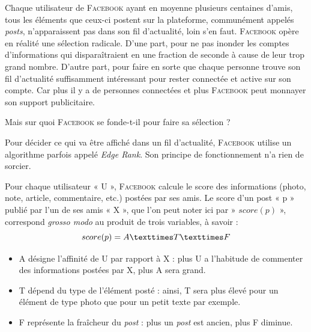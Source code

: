 Chaque utilisateur de \textsc{Facebook} ayant en moyenne plusieurs centaines d'amis, tous les éléments que ceux-ci postent sur la plateforme, communément appelés \textit{posts}, n'apparaissent pas dans son fil d'actualité, loin s'en faut. \textsc{Facebook} opère en réalité une sélection radicale. D'une part, pour ne pas inonder les comptes d'informations qui disparaîtraient en une fraction de seconde à cause de leur trop grand nombre. D'autre part, pour faire en sorte que chaque personne trouve son fil d'actualité suffisamment intéressant pour rester connectée et active sur son compte. Car plus il y a de personnes connectées et plus \textsc{Facebook} peut monnayer son support publicitaire.

Mais sur quoi \textsc{Facebook} se fonde-t-il pour faire sa sélection ?

Pour décider ce qui va être affiché dans un fil d'actualité, \textsc{Facebook} utilise un algorithme parfois appelé \textit{Edge Rank}. Son principe de fonctionnement n'a rien de sorcier. 

Pour chaque utilisateur « U », \textsc{Facebook} calcule le score des informations (photo, note, article, commentaire, etc.) postées par ses amis. Le score d'un post « p » publié par l'un de ses amis « X », que l'on peut noter ici par » $score(p)$ », correspond \textit{grosso modo} au produit de trois variables, à savoir :
\begin{equation}
score(p) = A × T × F\\
\end{equation}

\begin{itemize}
\item A désigne l'affinité de U par rapport à X : plus U a l'habitude de commenter des informations postées par X, plus A sera grand.
\item T dépend du type de l'élément posté : ainsi, T sera plus élevé pour un élément de type photo que pour un petit texte par exemple.
\item F représente la fraîcheur du \textit{post} : plus un \textit{post} est ancien, plus F diminue.
\end{itemize}

